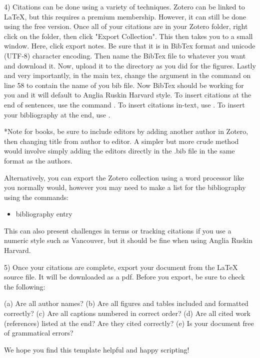     4) Citations can be done using a variety of techniques.
    Zotero can be linked to LaTeX, but this requires a premium
    membership. However, it can still be done using the free 
    version. Once all of your citations are in your Zotero 
    folder, right click on the folder, then click "Export
    Collection". This then takes you to a small window. 
    Here, click export notes. Be sure that it is in BibTex
    format and unicode (UTF-8) character encoding. Then 
    name the BibTex file to whatever you want and download it.
    Now, upload it to the directory as you did for the
    figures. Lastly and very importantly, in the main tex, 
    change the argument in the command 
    on line 58 to contain the name of you bib file. Now
    BibTex should be working for you and it will default to 
    Anglia Ruskin Harvard style. To insert citations at the 
    end of sentences, use the command \autocite{}. To insert
    citations in-text, use \textcite{}. To insert your
    bibliography at the end, use \printbibliography. 
    
    *Note for books, be sure to include editors by adding another author in Zotero, then changing title from author to editor. A simpler but more crude method would involve simply adding the editors directly in the .bib file in the same format as the authors.  
    
    Alternatively, you can export the Zotero collection
    using a word processor like you normally would, however
    you may need to make a list for the bibliography using the commands:
    \begin{itemize}
        \item[] bibliography entry
    \end{itemize}
    
    This can also present challenges in terms or tracking citations 
    if you use a numeric style such as Vancouver, but it should be fine
    when using Anglia Ruskin Harvard.
    
    5) Once your citations are complete, export your
    document from the LaTeX source file. It will be 
    downloaded as a pdf. Before you export, be sure
    to check the following:
     
     (a) Are all author names?
     (b) Are all figures and tables included and formatted correctly?
     (c) Are all captions numbered in correct order?
     (d) Are all cited work (references) listed at the end? Are they cited correctly?
     (e) Is your document free of grammatical errors?
     
     
    We hope you find this template helpful and happy
    scripting!